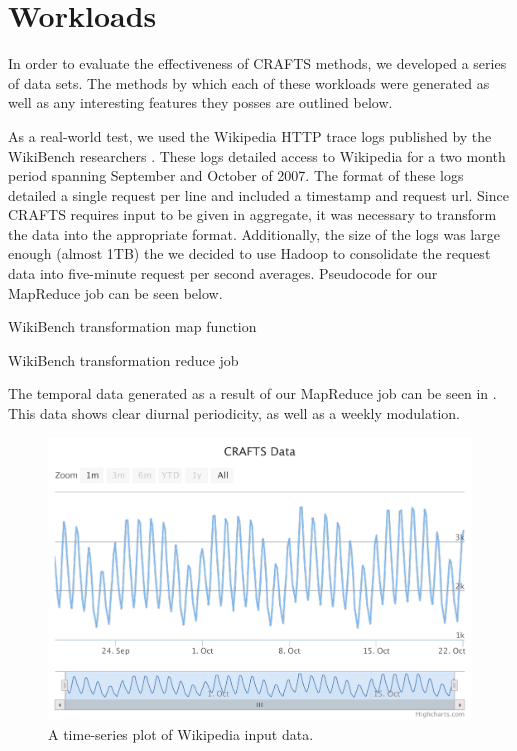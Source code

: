 \chapter{Workloads}
\label{ch:workloads}

In order to evaluate the effectiveness of CRAFTS methods, we developed a series of data sets. The methods by which each of these workloads were generated as well as any interesting features they posses are outlined below.

As a real-world test, we used the Wikipedia HTTP trace logs published by the WikiBench researchers \cite{wikitraces}. These logs detailed access to Wikipedia for a two month period spanning September and October of 2007. The format of these logs detailed a single request per line and included a timestamp and request url. Since CRAFTS requires input to be given in aggregate, it was necessary to transform the data into the appropriate format. Additionally, the size of the logs was large enough (almost 1TB) the we decided to use Hadoop to consolidate the request data into five-minute request per second averages. Pseudocode for our MapReduce job can be seen below.

\begin{algorithm}[H]
\caption{WikiBench transformation map function}
\end{algorithm}

\begin{algorithm}[H]
\caption{WikiBench transformation reduce job}
\end{algorithm}

The temporal data generated as a result of our MapReduce job can be seen in . This data shows clear diurnal periodicity, as well as a weekly modulation.

\begin{figure}
\centering
\includegraphics[width=\textwidth]{charts/wikibench.pdf}
\caption{A time-series plot of Wikipedia input data.}
\label{fig:wikibench2}
\end{figure}

